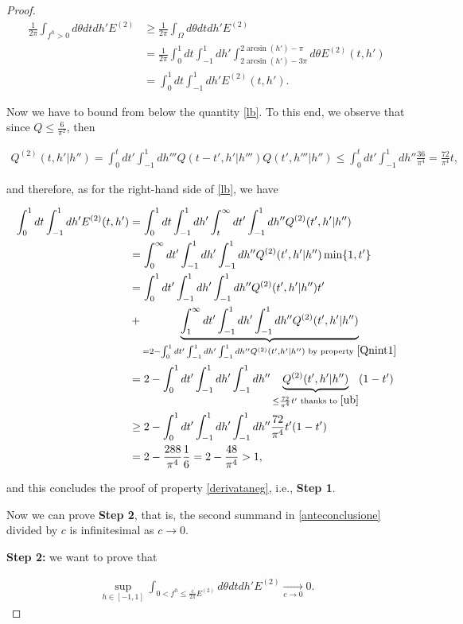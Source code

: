 \documentclass[a4paper,10pt,reqno]{amsart}
\numberwithin{equation}{subsection}
\numberwithin{figure}{subsection}
\begin{document}
\begin{proof}
\begin{align}
\nonumber\frac{1}{2\pi}\int_{f^h>0}d\theta dtdh' E^{(2)}&\geq\frac{1}{2\pi}\int_{\Omega}d\theta dtdh' E^{(2)}
\\
\nonumber&=\frac{1}{2\pi}\int_0^1dt\int_{-1}^1dh'\int_{2\arcsin(h')-3\pi}^{2\arcsin(h')-\pi}d\theta E^{(2)}(t,h')
\\
\label{lb}&=\int_0^1dt\int_{-1}^1dh'E^{(2)}(t,h').
\end{align}

Now we have to bound from below the quantity \eqref{lb}. To this end, we observe that since $Q\leq\frac{6}{\pi^2}$, then

{\small\begin{align}
\label{ub} Q^{(2)}(t,h'|h'')=\int_0^tdt'\int_{-1}^1dh'''Q(t-t',h'|h''')Q(t',h'''|h'')\leq\int_0^tdt'\int_{-1}^1dh''\frac{36}{\pi^4}=\frac{72}{\pi^4}t,
\end{align}}

and therefore, as for the right-hand side of \eqref{lb}, we have

\begin{align*}
\int_0^1dt\int_{-1}^1dh'E^{(2)}(t,h')&=\int_0^1dt\int_{-1}^1dh'\int_t^{\infty}dt'\int_{-1}^1dh''Q^{(2)}(t',h'|h'')
\\
&=\int_0^{\infty}dt'\int_{-1}^1dh'\int_{-1}^1dh''Q^{(2)}(t',h'|h'')\min\{1,t'\}
\\
&=\int_0^1dt'\int_{-1}^1dh'\int_{-1}^1dh''Q^{(2)}(t',h'|h'')t'
\\
&+\underbrace{\int_1^{\infty}dt'\int_{-1}^1dh'\int_{-1}^1dh''Q^{(2)}(t',h'|h'')}_{=2-\int_0^1dt'\int_{-1}^1dh'\int_{-1}^1dh''Q^{(2)}(t',h'|h'')\textrm{ by property }\eqref{Qnint1}}
\\
&=2-\int_0^1dt'\int_{-1}^1dh'\int_{-1}^1dh''\underbrace{Q^{(2)}(t',h'|h'')}_{\leq\frac{72}{\pi^4}t'\textrm{ thanks to }\eqref{ub}}(1-t')
\\
&\geq2-\int_0^1dt'\int_{-1}^1dh'\int_{-1}^1dh''\frac{72}{\pi^4}t'(1-t')
\\
&=2-\frac{288}{\pi^4}\frac{1}{6}=2-\frac{48}{\pi^4}>1,
\end{align*}

and this concludes the proof of property \eqref{derivataneg}, i.e., \textbf{Step 1}.

Now we can prove \textbf{Step 2}, that is, the second summand in \eqref{anteconclusione} divided by $c$ is infinitesimal as $c\to0$.

\textbf{Step 2: } we want to prove that

\begin{align*}
\sup_{h\in[-1,1]}\int_{0<f^h\leq\frac{c}{2\pi}E^{(2)}}d\theta dtdh'E^{(2)}\xrightarrow[c\to0]{}0.
\end{align*}


\end{proof}
\end{document}
